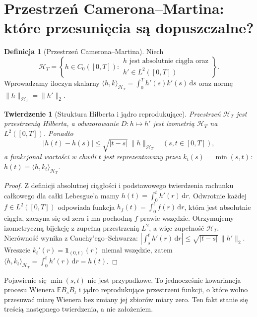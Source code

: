 \documentclass[11pt,a4paper,oneside]{report}
\numberwithin{equation}{chapter}
\theoremstyle{plain}
\newtheorem{twierdzenie}{Twierdzenie}[chapter]
\theoremstyle{definition}
\newtheorem{definicja}{Definicja}[chapter]
\theoremstyle{remark}
\newcommand{\E}{\mathbb{E}}
\newcommand{\calH}{\mathcal{H}}
\newcommand{\ind}[1]{\mathbf{1}_{#1}}
\newcommand{\dd}{\mathrm{d}}
\begin{document}
\section{Przestrzeń Camerona--Martina: które przesunięcia są dopuszczalne?}\label{sec:volIII:09:03}

\begin{definicja}[Przestrzeń Camerona--Martina]\label{def:volIII:09:02}
\label{def:CMspace}
Niech
\[
\calH_T=\left\{h\in C_0([0,T]):
\begin{array}{l}
 h\text{ jest absolutnie ciągła oraz}\\[-2pt]
 h'\in L^2([0,T])
\end{array}\right\}.
\]
Wprowadzamy iloczyn skalarny
$\langle h,k\rangle_{\calH_T}=\int_0^T h'(s)k'(s)\,\dd s$
oraz normę $\|h\|_{\calH_T}=\|h'\|_2$.
\end{definicja}

\begin{twierdzenie}[Struktura Hilberta i jądro reprodukujące]\label{thm:volIII:09:03}
\label{th:cm-hilbert}
Przestrzeń $\calH_T$ jest przestrzenią Hilberta,
a odwzorowanie $D:h\mapsto h'$ jest izometrią
$\calH_T$ na $L^2([0,T])$. Ponadto
\[
|h(t)-h(s)|\le\sqrt{|t-s|}\,\|h\|_{\calH_T}
\quad(s,t\in[0,T]),
\]
a funkcjonał wartości w chwili $t$ jest reprezentowany
przez $k_t(s)=\min(s,t)$:
$h(t)=\langle h,k_t\rangle_{\calH_T}$.
\end{twierdzenie}
\begin{proof}
Z definicji absolutnej ciągłości i podstawowego twierdzenia
rachunku całkowego dla całki Lebesgue'a mamy
$h(t)=\int_0^t h'(r)\,\dd r$. Odwrotnie każdej
$f\in L^2([0,T])$ odpowiada funkcja
$h_f(t)=\int_0^t f(r)\,\dd r$, która jest absolutnie
ciągła, zaczyna się od zera i ma pochodną $f$ prawie
wszędzie. Otrzymujemy izometryczną bijekcję z zupełną
przestrzenią $L^2$, a więc zupełność $\calH_T$.
Nierówność wynika z Cauchy'ego--Schwarza:
$|\int_s^t h'(r)\,\dd r|\le\sqrt{|t-s|}\,\|h'\|_2$.
Wreszcie $k_t'(r)=\ind{(0,t)}(r)$ niemal wszędzie, zatem
$\langle h,k_t\rangle_{\calH_T}=\int_0^t h'(r)\,\dd r=h(t)$.
\end{proof}

Pojawienie się $\min(s,t)$ nie jest przypadkowe. To jednocześnie
kowariancja procesu Wienera $\E B_sB_t$ i jądro reprodukujące
przestrzeni funkcji, o które wolno przesuwać miarę Wienera
bez zmiany jej zbiorów miary zero. Ten fakt stanie się treścią
następnego twierdzenia, a nie założeniem.
\end{document}
